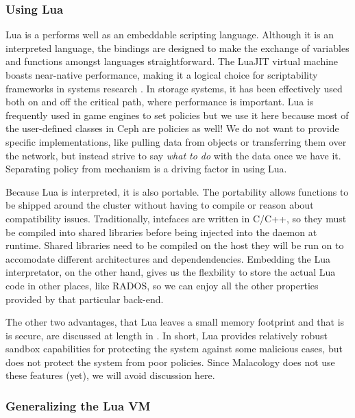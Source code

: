 \documentclass[10pt,twocolumn]{article}
\begin{document}
\subsubsection{Using Lua}\label{using-lua}

Lua is a performs well as an embeddable scripting language. Although it
is an interpreted language, the bindings are designed to make the
exchange of variables and functions amongst languages straightforward.
The LuaJIT virtual machine boasts near-native performance, making it a
logical choice for scriptability frameworks in systems research
\autocite{neto:dls14-luaos}. In storage systems, it has been effectively
used both on \autocites[
]{grawinkel:pdsw2012-lua}{watkins2013:bdmc13-in-vivo} and off
\autocite{sevilla:sc15-mantle} the critical path, where performance is
important. Lua is frequently used in game engines to set policies but we
use it here because most of the user-defined classes in Ceph are
policies as well! We do not want to provide specific implementations,
like pulling data from objects or transferring them over the network,
but instead strive to say \emph{what to do} with the data once we have
it. Separating policy from mechanism is a driving factor in using Lua.

Because Lua is interpreted, it is also portable. The portability allows
functions to be shipped around the cluster without having to compile or
reason about compatibility issues. Traditionally, intefaces are written
in C/C++, so they must be compiled into shared libraries before being
injected into the daemon at runtime. Shared libraries need to be
compiled on the host they will be run on to accomodate different
architectures and dependendencies. Embedding the Lua interpretator, on
the other hand, gives us the flexbility to store the actual Lua code in
other places, like RADOS, so we can enjoy all the other properties
provided by that particular back-end.

The other two advantages, that Lua leaves a small memory footprint and
that is is secure, are discussed at length in \autocites[
]{ierusalimschy_programming_2006}{neto:dls14-luaos}. In short, Lua
provides relatively robust sandbox capabilities for protecting the
system against some malicious cases, but does not protect the system
from poor policies. Since Malacology does not use these features (yet),
we will avoid discussion here.

\subsubsection{Generalizing the Lua VM}\label{generalizing-the-lua-vm}
\end{document}
